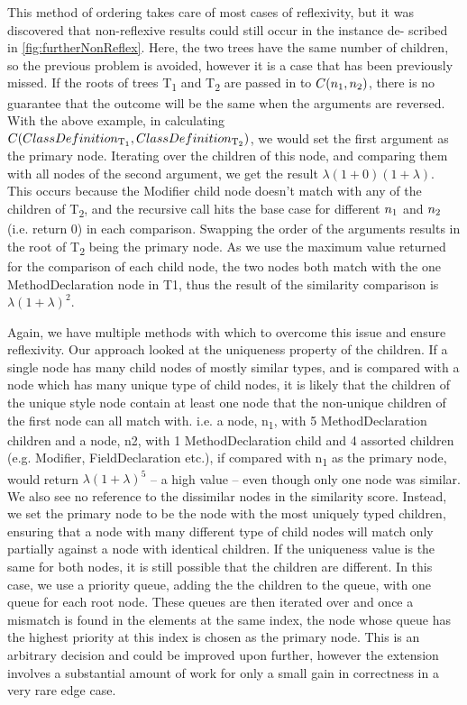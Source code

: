 This method of ordering takes care of most cases of reflexivity, but it
was discovered that non-reflexive results could still occur in the instance de-
scribed in \ref{fig:furtherNonReflex}. Here, the two trees have the same number of children, so the
previous problem is avoided, however it is a case that has been previously
missed. If the roots of trees T\textsubscript{1} and T\textsubscript{2} are passed in
 to $C(n\textsubscript{1},n\textsubscript{2})$, there
is no guarantee that the outcome will be the same when the arguments are reversed. With the above example, in calculating $C(ClassDefinition\textsubscript{T\textsubscript{1}},ClassDefinition\textsubscript{T\textsubscript{2}})$, we would set the first argument as the primary node. Iterating over the
children of this node, and comparing them with all nodes of the second argument, 
we get the result $\lambda(1 + 0)(1 + \lambda)$. This occurs because the Modifier
child node doesn’t match with any of the children of T\textsubscript{2}, and the recursive
call hits the base case for different $n\textsubscript{1}$ and $n\textsubscript{2}$ (i.e. return 0) in each 
comparison. Swapping the order of the arguments results in the root of T\textsubscript{2} being the
primary node. As we use the maximum value returned for the comparison
of each child node, the two \MethodDeclaration nodes both match with the one MethodDeclaration node in T1, thus the result of the similarity comparison is $\lambda(1 + \lambda)^2$.

Again, we have multiple methods with which to overcome this issue and ensure reflexivity. Our approach looked at the uniqueness property of the children. If a single node has many child nodes of mostly similar types, and is compared with a node which has many unique type of child nodes, it is likely that the children of the unique style node contain at least one node that the non-unique children of the first node can all match with. i.e. a node, n\textsubscript{1}, with 5 MethodDeclaration children and a node, n2, with 1 MethodDeclaration child and 4 assorted children (e.g. Modifier, FieldDeclaration etc.), if compared with n\textsubscript{1} as the primary node, would return $\lambda(1 + \lambda)^5$ -- a high value -- even though only one node was similar. We also see no reference to the dissimilar nodes in the similarity score. Instead, we set the primary node to be the node with the most uniquely typed children, ensuring that a node with many different type of child nodes will match only partially against a node with identical children.
If the uniqueness value is the same for both nodes, it is still possible that the children are different. In this case, we use a priority queue, adding the the children to the queue, with one queue for each root node. These queues are then iterated over and once a mismatch is found in the elements at the same index, the node whose queue has the highest priority at this index is chosen as the primary node. This is an arbitrary decision and could be improved upon further, however
the extension involves a substantial amount of work for only a small gain in correctness in a
very rare edge case.

